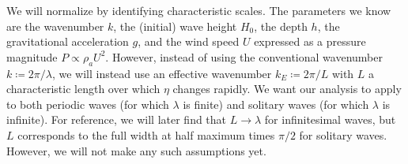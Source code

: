 \documentclass{jfm}
\begin{document}
We will normalize by identifying characteristic scales.
The parameters we know \apriori are the wavenumber $k$, the (initial)
wave height $H_0$, the depth $h$, the gravitational acceleration $g$,
and the wind speed $U$ expressed as a pressure magnitude $P \propto
\rho_a U^2$.
However, instead of using the conventional wavenumber $k \coloneqq 2 \pi
/ \lambda$, we will instead use an effective wavenumber $k_E \coloneqq 2
\pi/ L$ with $L$ a characteristic length over which $\eta$ changes
rapidly.
We want our analysis to apply to both periodic waves (for which
$\lambda$ is finite) and solitary waves (for which $\lambda$ is
infinite).
For reference, we will later find that $L \to \lambda$ for infinitesimal
waves, but $L$ corresponds to the full width at half maximum times $\pi/2$ for solitary
waves.
However, we will not make any such assumptions yet.
\end{document}
